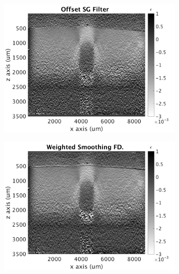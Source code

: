 \begin{figure}[bh!]
\begin{subfigure}{0.49\textwidth}
        \includegraphics[width=\textwidth]{figures/posg_fr40_lr20.png}
	\end{subfigure}
    \begin{subfigure}{0.49\textwidth}
    	\centering
        \includegraphics[width=\textwidth]{figures/wfd_fr40_lr20.png}
    \end{subfigure}
    \\
    \begin{subfigure}{0.49\textwidth}
    	\centering

\end{subfigure}
\end{figure}
